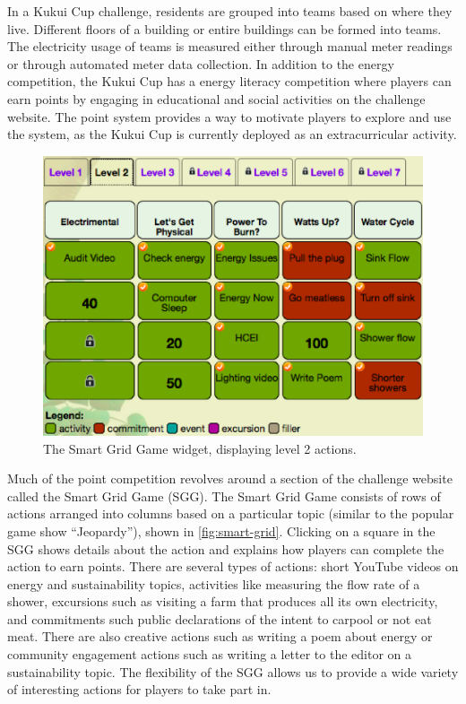 \documentclass[10pt, conference, compsocconf]{IEEEtran-old}
\begin{document}
In a Kukui Cup challenge, residents are grouped into teams based on where they live. Different floors of a building or entire buildings can be formed into teams. The electricity usage of teams is measured either through manual meter readings or through automated meter data collection. In addition to the energy competition, the Kukui Cup has a energy literacy competition where players can earn points by engaging in educational and social activities on the challenge website. The point system provides a way to motivate players to explore and use the system, as the Kukui Cup is currently deployed as an extracurricular activity.

\begin{figure}[!tb]
	\centering
	\includegraphics[width=\columnwidth]{smart-grid2.eps}
	\caption{The Smart Grid Game widget, displaying level 2 actions.}
	\label{fig:smart-grid}
\end{figure}

Much of the point competition revolves around a section of the challenge website called the Smart Grid Game (SGG). The Smart Grid Game consists of rows of actions arranged into columns based on a particular topic (similar to the popular game show ``Jeopardy''), shown in \autoref{fig:smart-grid}. Clicking on a square in the SGG shows details about the action and explains how players can complete the action to earn points. There are several types of actions: short YouTube videos on energy and sustainability topics, activities like measuring the flow rate of a shower, excursions such as visiting a farm that produces all its own electricity, and commitments such public declarations of the intent to carpool or not eat meat. There are also creative actions such as writing a poem about energy or community engagement actions such as writing a letter to the editor on a sustainability topic. The flexibility of the SGG allows us to provide a wide variety of interesting actions for players to take part in.
\end{document}
